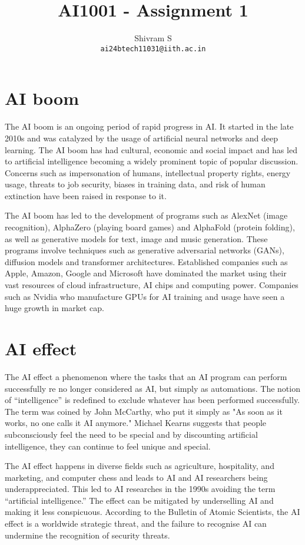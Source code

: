 \documentclass{article}
\author{Shivram S \\ \texttt{ai24btech11031@iith.ac.in}}
\title{AI1001 - Assignment 1}
\begin{document}
\maketitle

\section{AI boom}

The AI boom is an ongoing period of rapid progress in AI. It started in the late 2010s
and was catalyzed by the usage of artificial neural networks and deep learning. The AI
boom has had cultural, economic and social impact and has led to artificial intelligence
becoming a widely prominent topic of popular discussion. Concerns such as impersonation of
humans, intellectual property rights, energy usage, threats to job security, biases in
training data, and risk of human extinction have been raised in response to it.

The AI boom has led to the development of programs such as AlexNet (image recognition),
AlphaZero (playing board games) and AlphaFold (protein folding), as well as generative
models for text, image and music generation. These programs involve techniques such as
generative adversarial networks (GANs), diffusion models and transformer architectures.
Established companies such as Apple, Amazon, Google and Microsoft have dominated the
market using their vast resources of cloud infrastructure, AI chips and computing power.
Companies such as Nvidia who manufacture GPUs for AI training and usage have seen a huge
growth in market cap.

\section{AI effect}

The AI effect a phenomenon where the tasks that an AI program can perform successfully 
re no longer considered as AI, but simply as automations. The notion of ``intelligence''
is redefined to exclude whatever has been performed successfully. The term was coined by
John McCarthy, who put it simply as "As soon as it works, no one calls it AI anymore."
Michael Kearns suggests that people subconsciously feel the need to be special and by
discounting artificial intelligence, they can continue to feel unique and special.

The AI effect happens in diverse fields such as agriculture, hospitality, and marketing,
and computer chess and leads to AI and AI researchers being underappreciated. This led
to AI researches in the 1990s avoiding the term ``artificial intelligence.'' The effect
can be mitigated by underselling AI and making it less conspicuous. According to the
Bulletin of Atomic Scientists, the AI effect is a worldwide strategic threat, and the
failure to recognise AI can undermine the recognition of security threats.
\end{document}
